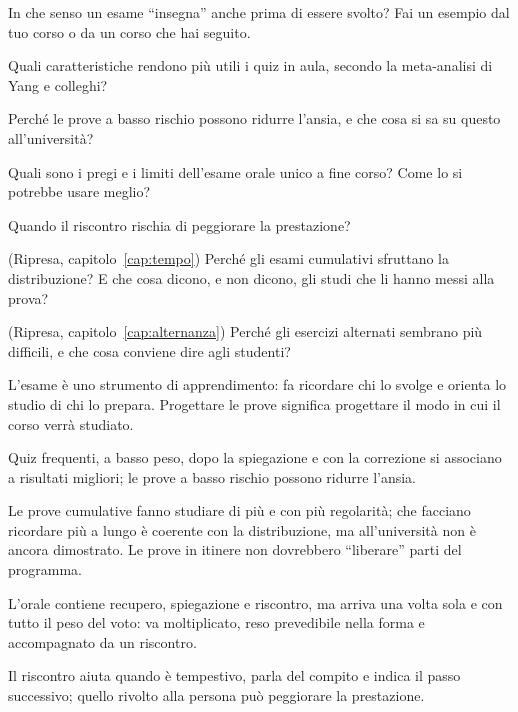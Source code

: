 \begin{domande}
  \item In che senso un esame \enquote{insegna} anche prima di essere
        svolto? Fai un esempio dal tuo corso o da un corso che hai
        seguito.
  \item Quali caratteristiche rendono più utili i quiz in aula, secondo
        la meta-analisi di Yang e colleghi?
  \item Perché le prove a basso rischio possono ridurre l'ansia, e che
        cosa si sa su questo all'università?
  \item Quali sono i pregi e i limiti dell'esame orale unico a fine
        corso? Come lo si potrebbe usare meglio?
  \item Quando il riscontro rischia di peggiorare la prestazione?
  \item (Ripresa, capitolo~\ref{cap:tempo}) Perché gli esami cumulativi
        sfruttano la distribuzione? E che cosa dicono, e non dicono, gli
        studi che li hanno messi alla prova?
  \item (Ripresa, capitolo~\ref{cap:alternanza}) Perché gli esercizi
        alternati sembrano più difficili, e che cosa conviene dire agli
        studenti?
\end{domande}

\begin{sintesi}
  \item L'esame è uno strumento di apprendimento: fa ricordare chi lo
        svolge e orienta lo studio di chi lo prepara. Progettare le
        prove significa progettare il modo in cui il corso verrà
        studiato.
  \item Quiz frequenti, a basso peso, dopo la spiegazione e con la
        correzione si associano a risultati migliori; le prove a basso
        rischio possono ridurre l'ansia.
  \item Le prove cumulative fanno studiare di più e con più
        regolarità; che facciano ricordare più a lungo è coerente con
        la distribuzione, ma all'università non è ancora dimostrato.
        Le prove in itinere non dovrebbero \enquote{liberare} parti del
        programma.
  \item L'orale contiene recupero, spiegazione e riscontro, ma arriva
        una volta sola e con tutto il peso del voto: va moltiplicato,
        reso prevedibile nella forma e accompagnato da un riscontro.
  \item Il riscontro aiuta quando è tempestivo, parla del compito e
        indica il passo successivo; quello rivolto alla persona può
        peggiorare la prestazione.
\end{sintesi}

\finecapitolo
